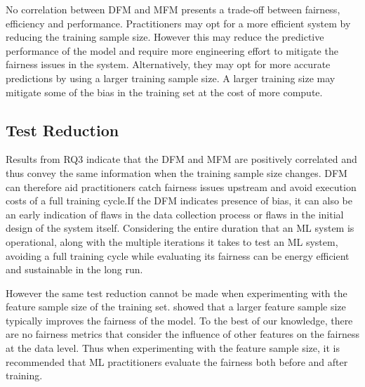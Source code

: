 \documentclass[sigconf,review,anonymous]{acmart}
\begin{document}
No correlation between DFM and MFM presents a trade-off between
fairness, efficiency and performance. Practitioners may opt for a more
efficient system by reducing the training sample size. However this
may reduce the predictive performance of the model and require more
engineering effort to mitigate the fairness issues in the system.
Alternatively, they may opt for more accurate predictions by using a
larger training sample size. A larger training size may mitigate some
of the bias in the training set at the cost of more compute.

\subsection{Test Reduction}\label{sec:discuss-test-red}

Results from RQ3 indicate that the DFM and MFM are positively
correlated and thus convey the same information when the training
sample size changes. DFM can therefore aid practitioners catch
fairness issues upstream and avoid execution costs of a full training
cycle.If the DFM indicates presence of bias, it can also be an early
indication of flaws in the data collection process or flaws in the
initial design of the system itself. Considering the entire duration
that an ML system is operational, along with the multiple iterations
it takes to test an ML system, avoiding a full training cycle while
evaluating its fairness can be energy efficient and sustainable in the
long run.

However the same test reduction cannot be made when experimenting with
the feature sample size of the training
set. \citet{zhang2021ignorance} showed that a larger feature sample
size typically improves the fairness of the model. To the best of our
knowledge, there are no fairness metrics that consider the influence
of other features on the fairness at the data level. Thus when
experimenting with the feature sample size, it is recommended that ML
practitioners evaluate the fairness both before and after training.


\end{document}
